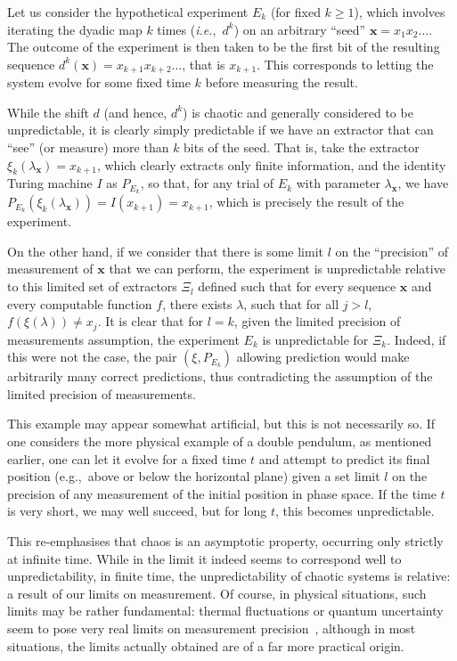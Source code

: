 \documentclass[information,article,accept,moreauthors,pdftex,12pt,a4paper]{mdpi}
\theoremstyle{mdpi}
\newcounter{ex}
\newcounter{re}
\theoremstyle{mdpidefinition}
\newcommand{\x}{\mathbf{x}}
\begin{document}
Let us consider the hypothetical experiment $E_k$ (for fixed $k\ge 1$), which involves iterating the dyadic map $k$ times (\emph{i.e.},\ $d^k$) on an arbitrary ``seed'' $\x=x_1x_2\dots$.
The outcome of the experiment is then taken to be the first bit of the resulting sequence $d^k(\x)=x_{k+1}x_{k+2}\dots$, that is $x_{k+1}$.
This corresponds to letting the system evolve for some fixed time $k$ before measuring the result.

While the shift $d$ (and hence, $d^k$) is chaotic and generally considered to be unpredictable, it is clearly simply predictable if we have an extractor that can ``see'' (or measure) more than $k$ bits of the seed.
That is, take the extractor $\xi_k(\lambda_\x) = x_{k+1}$, which clearly extracts only finite information, and the identity Turing machine $I$ as $P_{E_k}$, so that, for any trial of $E_k$ with parameter $\lambda_\x$, we have $P_{E_k}(\xi_k(\lambda_\x)) = I(x_{k+1})=x_{k+1}$, which is precisely the result of the experiment.


On the other hand, if we consider that there is some limit $l$ on the ``precision'' of measurement of $\x$ that we can perform, the experiment is unpredictable relative to this limited set of extractors $\Xi_l$ defined such that for every sequence $\x$ and every computable function $f$, there exists $\lambda$, such that for all
$j>l$, $f(\xi(\lambda))\not=x_j$. It is clear that for $l=k$, {given the limited precision of measurements assumption},
the experiment $E_k$ is unpredictable for $\Xi_k$. Indeed, if this were not the case, the pair $(\xi,P_{E_k})$ allowing prediction would make arbitrarily many correct predictions, thus contradicting the assumption of the limited precision of measurements.

This example may appear somewhat artificial, but this is not necessarily so.
If one considers the more physical example of a double pendulum, as mentioned earlier, one can let it evolve for a fixed time $t$ and attempt to predict its final position (e.g.,\ above or below the horizontal plane) given a set limit $l$ on the precision of any measurement of the initial position in phase space.
If the time $t$ is very short, we may well succeed, but for long $t$, this becomes unpredictable.

This re-emphasises that chaos is an asymptotic property, occurring only strictly at infinite time.
While in the limit it indeed seems to correspond well to unpredictability, in finite time, the unpredictability of chaotic systems is relative: a result of our limits on measurement.
Of course, in physical situations, such limits may be rather fundamental: thermal fluctuations or quantum uncertainty seem to pose very real limits on measurement precision~\cite{Longo:2008ud}, although in most situations, the limits actually obtained are of a far more practical origin.
\end{document}
